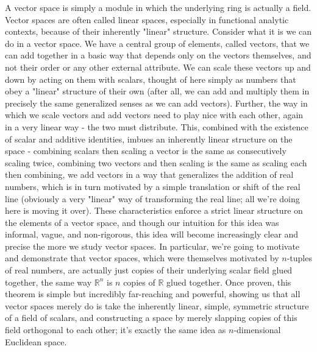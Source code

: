 \documentclass{article}
\newcommand{\nn}{\leavevmode \newline \newline}
\newcommand{\R}{\mathbb{R}}
\begin{document}
A vector space is simply a module in which the underlying ring is actually a field. Vector spaces are often called linear spaces, especially in functional analytic contexts, because of their inherently "linear" structure. Consider what it is we can do in a vector space. We have a central group of elements, called vectors, that we can add together in a basic way that depends only on the vectors themselves, and not their order or any other external attribute. We can scale these vectors up and down by acting on them with scalars, thought of here simply as numbers that obey a "linear" structure of their own (after all, we can add and multiply them in precisely the same generalized senses as we can add vectors). Further, the way in which we scale vectors and add vectors need to play nice with each other, again in a very linear way - the two must distribute. This, combined with the existence of scalar and additive identities, imbues an inherently linear structure on the space - combining scalars then scaling a vector is the same as consecutively scaling twice, combining two vectors and then scaling is the same as scaling each then combining, we add vectors in a way that generalizes the addition of real numbers, which is in turn motivated by a simple translation or shift of the real line (obviously a very "linear" way of transforming the real line; all we're doing here is moving it over).
\nn
These characteristics enforce a strict linear structure on the elements of a vector space, and though our intuition for this idea was informal, vague, and non-rigorous, this idea will become increasingly clear and precise the more we study vector spaces. In particular, we're going to motivate and demonstrate that vector spaces, which were themselves motivated by $ n $-tuples of real numbers, are actually just copies of their underlying scalar field glued together, the same way $ \R^n $ is $ n $ copies of $ \R $ glued together. Once proven, this theorem is simple but incredibly far-reaching and powerful, showing us that all vector spaces merely do is take the inherently linear, simple, symmetric structure of a field of scalars, and constructing a space by merely slapping copies of this field orthogonal to each other; it's exactly the same idea as $ n $-dimensional Euclidean space.
\nn
\end{document}

